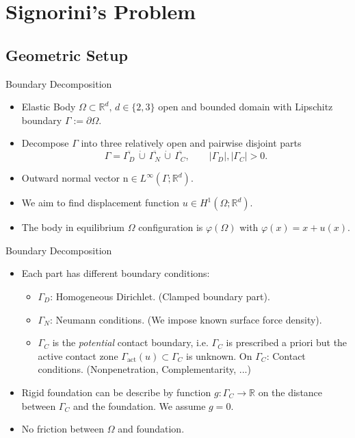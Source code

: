 \documentclass[10pt,aspectratio=169]{beamer}
\def\R{{\mathbb R}}
\begin{document}
\section{Signorini's Problem}
\subsection{Geometric Setup}
\begin{frame}{Boundary Decomposition}
	\begin{itemize}
		\item Elastic Body $\Omega\subset\R^d,\,d\in\{2,3\}$ open and bounded domain with Lipschitz boundary $\Gamma:= \partial\Omega$.
		\item Decompose $\Gamma$ into three relatively open and pairwise disjoint parts
		      \begin{equation*}
			      \Gamma = \overline{\Gamma_D}\,\mathbin{\dot\cup}\,\overline{\Gamma_N}\,\mathbin{\dot\cup}\,\overline{\Gamma_C},\qquad |\Gamma_D|,|\Gamma_C|>0.
		      \end{equation*}
		\item Outward normal vector $\mathrm{n}\in L^\infty(\Gamma;\R^d)$.
		\item We aim to find displacement function $u\in H^1(\Omega;\R^d)$.
		\item The body in equilibrium $\Omega$ configuration is $\varphi(\Omega)$ with $\varphi(x) = x+u(x)$.
	\end{itemize}
\end{frame}

\begin{frame}{Boundary Decomposition}
	\begin{itemize}
		\item Each part has different boundary conditions:
		      \begin{itemize}
			      \item $\Gamma_D$: Homogeneous Dirichlet. (Clamped boundary part).
			      \item $\Gamma_N$: Neumann conditions. (We impose known surface force density).
			      \item $\Gamma_C$ is the {\em potential} contact boundary, i.e. $\Gamma_C$ is prescribed a priori but the active contact zone $\Gamma_{\mathrm{act}}(u)\subset\Gamma_C$ is unknown. On $\Gamma_C$: Contact conditions. (Nonpenetration, Complementarity, ...)
		      \end{itemize}
		\item Rigid foundation can be describe by function $g:\Gamma_C\to\R$ on the distance between $\Gamma_C$ and the foundation. We assume $g = 0$.
		\item No friction between $\Omega$ and foundation.
	\end{itemize}
	\begin{figure}[!h]
		\centering
		
	\end{figure}
\end{frame}
\end{document}
